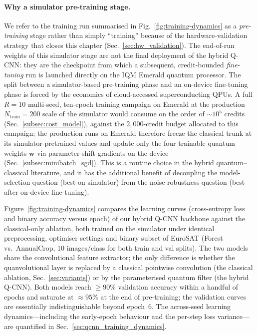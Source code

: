 \paragraph{Why a simulator pre-training stage.}
We refer to the training run summarised in
Fig.~\ref{fig:training-dynamics} as a \emph{pre-training} stage rather
than simply ``training'' because of the hardware-validation strategy
that closes this chapter (Sec.~\ref{sec:hw_validation}). The
end-of-run weights of this simulator stage are not the final deployment
of the hybrid Q-CNN: they are the checkpoint from which a subsequent,
credit-bounded \emph{fine-tuning} run is launched directly on the IQM
Emerald quantum processor. The split between a simulator-based
pre-training phase and an on-device fine-tuning phase is forced by the
economics of cloud-accessed superconducting QPUs. A full $R=10$ multi-seed,
ten-epoch training campaign on Emerald at the production
$N_{\mathrm{train}}=200$ scale of the simulator would consume on the
order of $\sim 10^{5}$ credits (Sec.~\ref{subsec:cost_model}), against
the $2{,}000$-credit budget allocated to this campaign; the production
runs on Emerald therefore freeze the classical trunk at its
simulator-pretrained values and update only the four trainable quantum
weights $\boldsymbol{w}$ via parameter-shift gradients on the device
(Sec.~\ref{subsec:minibatch_sgd}). This is a routine choice in the
hybrid quantum--classical literature, and it has the additional benefit
of decoupling the model-selection question (best on simulator) from the
noise-robustness question (best after on-device fine-tuning).

Figure~\ref{fig:training-dynamics} compares the learning curves (cross-entropy loss and binary accuracy versus epoch) of our hybrid Q-CNN backbone against the classical-only ablation, both trained on the simulator under identical preprocessing, optimiser settings and binary subset of EuroSAT (Forest vs.\ AnnualCrop, $10$ images/class for both train and val splits). The two models share the convolutional feature extractor; the only difference is whether the quanvolutional layer is replaced by a classical pointwise convolution (the classical ablation, Sec.~\ref{sec:variants}) or by the parameterised quantum filter (the hybrid Q-CNN). Both models reach $\geq 90\%$ validation accuracy within a handful of epochs and saturate at $\approx 95\%$ at the end of pre-training; the validation curves are essentially indistinguishable beyond epoch~6. The across-seed learning dynamics---including the early-epoch behaviour and the per-step loss variance---are quantified in Sec.~\ref{sec:qcnn_training_dynamics}.


